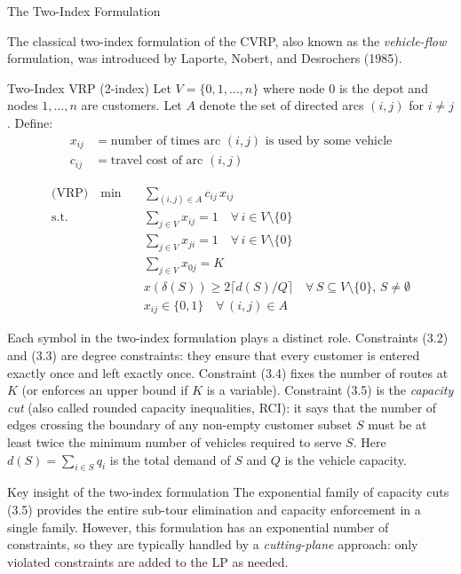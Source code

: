 \documentclass[aspectratio=169,10pt]{beamer}
\begin{document}
\begin{frame}[allowframebreaks]{The Two-Index Formulation}

The classical two-index formulation of the CVRP, also known as the
\emph{vehicle-flow} formulation, was introduced by Laporte, Nobert,
and Desrochers (1985).

\begin{block}{Two-Index VRP (2-index)}
Let $V = \{0, 1, \ldots, n\}$ where node 0 is the depot and nodes
$1, \ldots, n$ are customers. Let $A$ denote the set of directed arcs
$(i,j)$ for $i \neq j$. Define:
\begin{align*}
  x_{ij} &= \text{number of times arc } (i,j) \text{ is used by some vehicle}\\
  c_{ij} &= \text{travel cost of arc } (i,j)
\end{align*}

\begin{align}
  \text{(VRP)} \quad \min \quad & \sum_{(i,j)\in A} c_{ij}\, x_{ij} \tag{3.1}\\
  \text{s.t.} \quad
  & \sum_{j\in V} x_{ij} = 1 \quad \forall\, i \in V\setminus\{0\} \tag{3.2}\\
  & \sum_{j\in V} x_{ji} = 1 \quad \forall\, i \in V\setminus\{0\} \tag{3.3}\\
  & \sum_{j\in V} x_{0j} = K \tag{3.4}\\
  & x(\delta(S)) \geq 2\Big\lceil d(S)/Q \Big\rceil
    \quad \forall\, S \subseteq V\setminus\{0\},\, S \neq \emptyset \tag{3.5}\\
  & x_{ij} \in \{0, 1\} \quad \forall\, (i,j)\in A \tag{3.6}
\end{align}
\end{block}

\framebreak

Each symbol in the two-index formulation plays a distinct role. Constraints
(3.2) and (3.3) are degree constraints: they ensure that every customer is
entered exactly once and left exactly once. Constraint (3.4) fixes the
number of routes at $K$ (or enforces an upper bound if $K$ is a variable).
Constraint (3.5) is the \emph{capacity cut} (also called rounded capacity
inequalities, RCI): it says that the number of edges crossing the boundary
of any non-empty customer subset $S$ must be at least twice the minimum number
of vehicles required to serve $S$. Here $d(S) = \sum_{i \in S} q_i$ is the
total demand of $S$ and $Q$ is the vehicle capacity.

\begin{alertblock}{Key insight of the two-index formulation}
The exponential family of capacity cuts (3.5) provides the entire
sub-tour elimination and capacity enforcement in a single family. However,
this formulation has an exponential number of constraints, so they are
typically handled by a \emph{cutting-plane} approach: only violated
constraints are added to the LP as needed.
\end{alertblock}


\end{frame}
\end{document}
